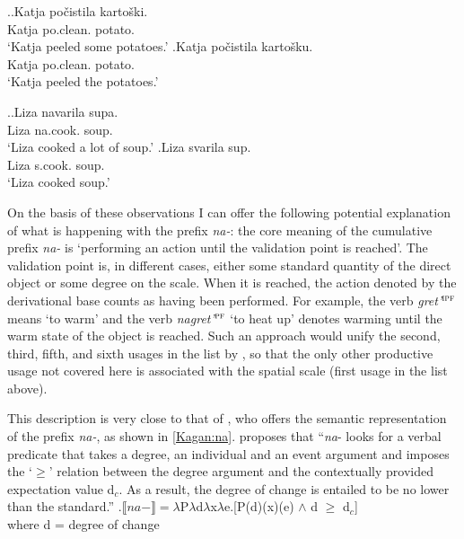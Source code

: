 \ex.\label{ex:na:po}\ag.\label{ex:na:po:gen}Katja po\v{c}istila karto\v{s}ki.\\
Katja po.clean. potato.\\
\trans `Katja peeled some potatoes.'
\bg.\label{ex:na:po:acc}Katja po\v{c}istila karto\v{s}ku.\\
Katja po.clean. potato.\\
\trans `Katja peeled the potatoes.'

\ex.\ag.\label{ex:navarit}Liza navarila supa.\\
Liza na.cook. soup.\\
\trans `Liza cooked a lot of soup.'
\bg.\label{ex:svarit}Liza svarila sup.\\
Liza s.cook. soup.\\
\trans `Liza cooked soup.'

On the basis of these observations I can offer the following potential explanation of what is happening with the prefix \textit{na-}: the core meaning of the cumulative prefix \textit{na-} is `performing an action until the validation point is reached'. The validation point is, in different cases, either some standard quantity of the direct object or some degree on the scale. When it is reached, the action denoted by the derivational base counts as having been performed. For example, the verb \textit{gret'}$^{\textsc{ipf}}$ means `to warm' and the verb \textit{nagret'}$^{\textsc{pf}}$ `to heat up' denotes warming until the warm state of the object is reached. Such an approach would unify the second, third, fifth, and sixth usages in the list by \citet{Shvedova:82}, so that the only other productive usage not covered here is associated with the spatial scale (first usage in the list above). 

This description is very close to that of \citet{Kagan:book}, who offers the semantic representation of the prefix \textit{na-}, as shown in \ref{Kagan:na}. \citet[55]{Kagan:book} proposes that ``\textit{na}- looks for a verbal predicate that takes a degree, an individual and an event argument and imposes the `$\geqslant$' relation between the degree argument and the contextually provided expectation value d$_c$. As a result, the degree of change is entailed to be no lower than the standard.''
\ex.\label{Kagan:na}$\llbracket na- \rrbracket = \lambda$P$\lambda$d$\lambda$x$\lambda$e.[P(d)(x)(e) $\wedge$ d $\geqslant$ d$_c$]\\
where d = degree of change \citep{KennedyLevin:02}\\

